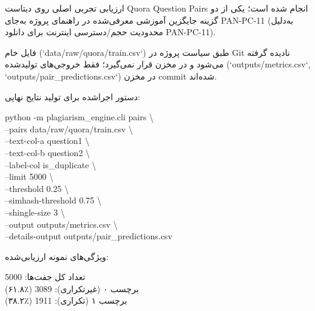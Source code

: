 \documentclass[11pt]{article}
\begin{document}
\noindent ‏ارزیابی تجربی اصلی روی دیتاست Quora Question Pairs انجام شده است؛ یکی از دو گزینه جایگزین آموزشی معرفی‌شده در راهنمای پروژه به‌جای PAN-PC-11 (به‌دلیل محدودیت حجم/دسترسی اینترنت برای دانلود PAN-PC-11).\par

\noindent ‏فایل خام (`data/raw/quora/train.csv`) طبق سیاست پروژه در Git نادیده گرفته می‌شود و در مخزن قرار نمی‌گیرد؛ فقط خروجی‌های تولیدشده (`outputs/metrics.csv`, `outputs/pair\_predictions.csv`) در مخزن commit شده‌اند.\par

\noindent ‏دستور اجراشده برای تولید نتایج نهایی:\par

{\mycode
\begin{flushleft}
python -m plagiarism\_engine.cli pairs \textbackslash{} \\
\hspace*{1.10em}--pairs data/raw/quora/train.csv \textbackslash{} \\
\hspace*{1.10em}--text-col-a question1 \textbackslash{} \\
\hspace*{1.10em}--text-col-b question2 \textbackslash{} \\
\hspace*{1.10em}--label-col is\_duplicate \textbackslash{} \\
\hspace*{1.10em}--limit 5000 \textbackslash{} \\
\hspace*{1.10em}--threshold 0.25 \textbackslash{} \\
\hspace*{1.10em}--simhash-threshold 0.75 \textbackslash{} \\
\hspace*{1.10em}--shingle-size 3 \textbackslash{} \\
\hspace*{1.10em}--output outputs/metrics.csv \textbackslash{} \\
\hspace*{1.10em}--details-output outputs/pair\_predictions.csv
\end{flushleft}}

\noindent ‏ویژگی‌های نمونه ارزیابی‌شده:\par

{\mycode
\begin{flushleft}
تعداد کل جفت‌ها:      5000 \\
برچسب ۰ (غیرتکراری):  3089   (٪۶۱.۸) \\
برچسب ۱ (تکراری):     1911   (٪۳۸.۲)
\end{flushleft}}
\end{document}
